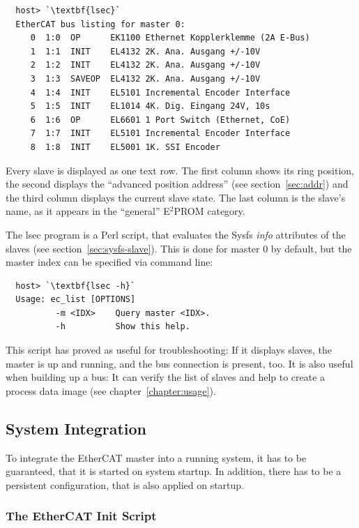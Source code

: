 \documentclass[a4paper,12pt,BCOR6mm,bibtotoc,idxtotoc]{scrbook}
\begin{document}
\begin{lstlisting}
  host> `\textbf{lsec}`
  EtherCAT bus listing for master 0:
     0  1:0  OP      EK1100 Ethernet Kopplerklemme (2A E-Bus)
     1  1:1  INIT    EL4132 2K. Ana. Ausgang +/-10V
     2  1:2  INIT    EL4132 2K. Ana. Ausgang +/-10V
     3  1:3  SAVEOP  EL4132 2K. Ana. Ausgang +/-10V
     4  1:4  INIT    EL5101 Incremental Encoder Interface
     5  1:5  INIT    EL1014 4K. Dig. Eingang 24V, 10s
     6  1:6  OP      EL6601 1 Port Switch (Ethernet, CoE)
     7  1:7  INIT    EL5101 Incremental Encoder Interface
     8  1:8  INIT    EL5001 1K. SSI Encoder
\end{lstlisting}

Every slave is displayed as one text row. The first column shows its
ring position, the second displays the ``advanced position address''
(see section~\ref{sec:addr}) and the third column displays the current
slave state. The last column is the slave's name, as it appears in the
``general'' E$^2$PROM category.

The lsec program is a Perl script, that evaluates the Sysfs
\textit{info} attributes of the slaves (see
section~\ref{sec:sysfs-slave}). This is done for master $0$ by
default, but the master index can be specified via command line:

\begin{lstlisting}
  host> `\textbf{lsec -h}`
  Usage: ec_list [OPTIONS]
          -m <IDX>    Query master <IDX>.
          -h          Show this help.
\end{lstlisting}

This script has proved as useful for troubleshooting: If it displays
slaves, the master is up and running, and the bus connection is
present, too. It is also useful when building up a bus: It can verify
the list of slaves and help to create a process data image (see
chapter~\ref{chapter:usage}).


\subsection{System Integration}
\label{sec:system}

To integrate the EtherCAT master into a running system, it has to be
guaranteed, that it is started on system startup. In addition, there has
to be a persistent configuration, that is also applied on startup.

\subsubsection{The EtherCAT Init Script}
\label{sec:init}
\end{document}
